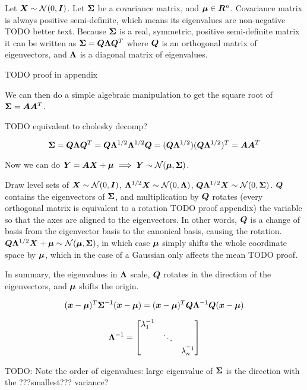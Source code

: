 \begin{tcolorbox}
  Let ${\bm{X}} \sim {\mathcal{N}}(0, {\bm{I}})$. Let ${\bm{\Sigma}}$ be a covariance matrix, and ${\bm{\mu}}
  \in {\bm{R}}^n$. Covariance matrix is always positive semi-definite, which means
  its eigenvalues are non-negative {TODO better text}. Because ${\bm{\Sigma}}$ is a
  real, symmetric, positive semi-definite matrix it can be written as
  ${\bm{\Sigma}} = {\bm{Q}} {\bm{\Lambda}} {\bm{Q}}^T$ where ${\bm{Q}}$ is an orthogonal matrix of
  eigenvectors, and ${\bm{\Lambda}}$ is a diagonal matrix of eigenvalues.

  TODO proof in appendix

  We can then do a simple algebraic manipulation to get the square root of ${\bm{\Sigma}} = {\bm{A}} {\bm{A}}^T$.

  TODO equivalent to cholesky decomp?

  \begin{equation}
    {\bm{\Sigma}} = {\bm{Q}} {\bm{\Lambda}} {\bm{Q}}^T = {\bm{Q}} {\bm{\Lambda}}^{1/2} {\bm{\Lambda}}^{1/2} {\bm{Q}} = ({\bm{Q}}
    {\bm{\Lambda}}^{1/2}) ({\bm{Q}} {\bm{\Lambda}}^{1/2})^T = {\bm{A}} {\bm{A}}^T
  \end{equation}

  Now we can do ${\bm{Y}} = {\bm{A}} {\bm{X}} + {\bm{\mu}} \implies {\bm{Y}} \sim {\mathcal{N}}({\bm{\mu}}, {\bm{\Sigma}})$.

  Draw level sets of ${\bm{X}} \sim {\mathcal{N}}(0, {\bm{I}})$, ${\bm{\Lambda}}^{1/2} {\bm{X}} \sim {\mathcal{N}}(0,
  {\bm{\Lambda}})$, ${\bm{Q}} {\bm{\Lambda}}^{1/2} {\bm{X}} \sim {\mathcal{N}}(0, {\bm{\Sigma}})$. ${\bm{Q}}$ contains the
  eigenvectors of ${\bm{\Sigma}}$, and multiplication by ${\bm{Q}}$ rotates (every
  orthogonal matrix is equivalent to a rotation  {TODO proof appendix}) the
  variable so that the axes are aligned to the eigenvectors. In other words,
  ${\bm{Q}}$ is a change of basis from the eigenvector basis to the canonical basis,
  causing the rotation. ${\bm{Q}} {\bm{\Lambda}}^{1/2} {\bm{X}} + {\bm{\mu}} \sim {\mathcal{N}}({\bm{\mu}},
  {\bm{\Sigma}})$, in which case ${\bm{\mu}}$ simply shifts the whole coordinate space by
  ${\bm{\mu}}$, which in the case of a Gaussian only affects the mean {TODO proof}.

  In summary, the eigenvalues in ${\bm{\Lambda}}$ scale, ${\bm{Q}}$ rotates in the
  direction of the eigenvectors, and ${\bm{\mu}}$ shifts the origin.

  \begin{equation}
    ({\bm{x}} - {\bm{\mu}})^T {\bm{\Sigma}}^{-1} ({\bm{x}} - {\bm{\mu}}) = ({\bm{x}} - {\bm{\mu}})^T {\bm{Q}} {\bm{\Lambda}}^{-1} {\bm{Q}} ({\bm{x}} - {\bm{\mu}})
  \end{equation}

  \begin{equation}
    {\bm{\Lambda}}^{-1} = \begin{bmatrix}
      \lambda_1^{-1} & & \\
                     & \ddots & \\
                     & & \lambda_n^{^-1}
    \end{bmatrix}
  \end{equation}

  TODO: Note the order of eigenvalues: large eigenvalue of ${\bm{\Sigma}}$ is the
  direction with the ???smallest??? variance?
\end{tcolorbox}


